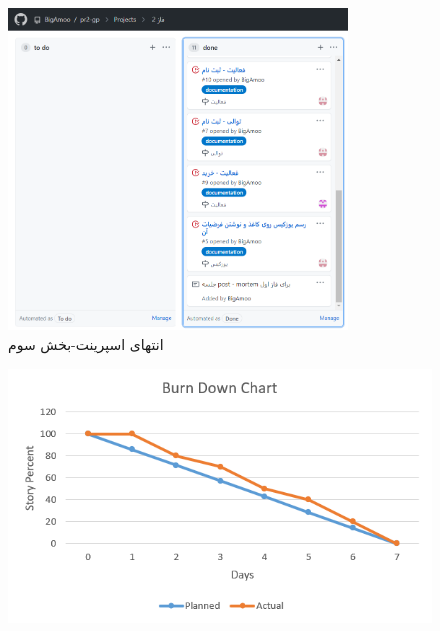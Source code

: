 \documentclass[12pt,a4paper]{article}
\begin{document}
	\begin{figure}[h!]
		\begin{center}
			\includegraphics[width=9cm]{images/screenshot_6.png}
		\end{center}
		\caption{انتهای اسپرینت-بخش سوم}
	\end{figure}

\pagebreak


\begin{figure}[h!]
	\begin{center}
		\includegraphics[width=14cm]{images/Burn Down Chart.png}
		
	\end{center}
	\caption{}
\end{figure}
\end{document}
